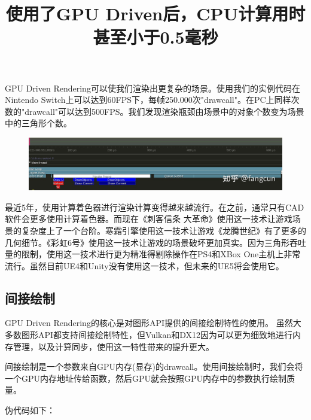 \documentclass{ctexart}
\begin{document}
GPU Driven Rendering可以使我们渲染出更复杂的场景。使用我们的实例代码在Nintendo Switch上可以达到60FPS下，每帧250.000次"drawcall"。在PC上同样次数的"drawcall"可以达到500FPS。我们发现渲染瓶颈由场景中的对象个数变为场景中的三角形个数。

\begin{figure}[H]
	\title{使用了GPU Driven后，CPU计算用时甚至小于0.5毫秒}
	\centering
	\includegraphics[scale=0.3]{img/1-2.jpg}
\end{figure}

最近5年，使用计算着色器进行渲染计算变得越来越流行。在之前，通常只有CAD软件会更多使用计算着色器。而现在《刺客信条 大革命》使用这一技术让游戏场景的复杂度上了一个台阶。寒霜引擎使用这一技术让游戏《龙腾世纪》有了更多的几何细节。《彩虹6号》使用这一技术让游戏的场景破坏更加真实。因为三角形吞吐量的限制，使用这一技术进行更为精准得剔除操作在PS4和XBox One主机上非常流行。虽然目前UE4和Unity没有使用这一技术，但未来的UE5将会使用它。

\subsection{间接绘制}

GPU Driven Rendering的核心是对图形API提供的间接绘制特性的使用。 虽然大多数图形API都支持间接绘制特性，但Vulkan和DX12因为可以更为细致地进行内存管理，以及计算同步，使用这一特性带来的提升更大。

间接绘制是一个参数来自GPU内存(显存)的drawcall。使用间接绘制时，我们会将一个GPU内存地址传给函数，然后GPU就会按照GPU内存中的参数执行绘制质量。

伪代码如下：
\end{document}

